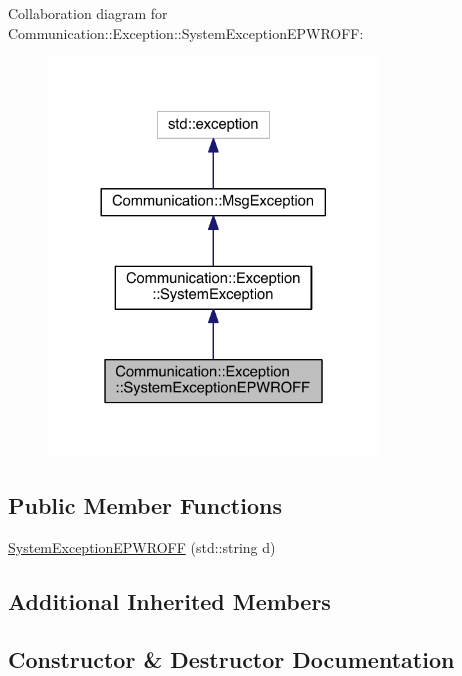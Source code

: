 Collaboration diagram for Communication\+:\+:Exception\+:\+:System\+Exception\+E\+P\+W\+R\+O\+F\+F\+:\nopagebreak
\begin{figure}[H]
\begin{center}
\leavevmode
\includegraphics[width=248pt]{class_communication_1_1_exception_1_1_system_exception_e_p_w_r_o_f_f__coll__graph}
\end{center}
\end{figure}
\subsection*{Public Member Functions}
\begin{DoxyCompactItemize}
\item 
\hyperlink{class_communication_1_1_exception_1_1_system_exception_e_p_w_r_o_f_f_adcdd6a974f7d783294b35154bb9c1b70}{System\+Exception\+E\+P\+W\+R\+O\+F\+F} (std\+::string d)
\end{DoxyCompactItemize}
\subsection*{Additional Inherited Members}


\subsection{Constructor \& Destructor Documentation}
\hypertarget{class_communication_1_1_exception_1_1_system_exception_e_p_w_r_o_f_f_adcdd6a974f7d783294b35154bb9c1b70}{}
